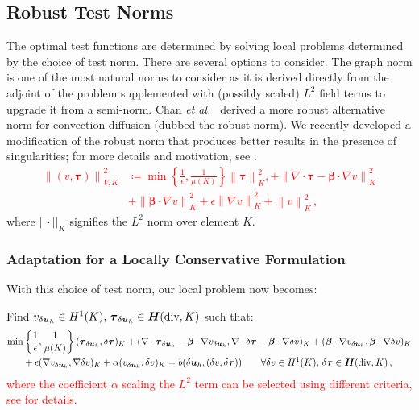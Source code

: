 \documentclass[letterpaper]{article}
\def\btau{\boldsymbol\tau}
\def\bbeta{\boldsymbol\beta}
\newcommand{\bs}[1]{\boldsymbol{#1}}
\newcommand{\norm}[1]{\left\| #1 \right\|}
\newcommand{\LRp}[1]{\left( #1 \right)}
\newcommand{\Grad} {\ensuremath{\nabla}}
\newcommand{\bfH}{\mbox{\boldmath $H$}}
\newcommand{\HdivK}{\bfH(\text{div},K)}
\newcommand{\HOneK}{H^{1}(K)}
\newcommand{\vdeltau}{v_{\delta\bs u_h}}
\newcommand{\taudeltau}{\btau_{\delta\bs u_h}}
\def\etal{{\it et al.~}}
\newcommand{\grad}{\nabla}
\renewcommand{\div}{\grad \cdot}
\newcommand{\red}[1]{\textcolor{red}{#1}}
\begin{document}

\subsection{Robust Test Norms}
\label{sec:robustNorms}
The optimal test functions are determined by solving local problems determined
by the choice of test norm. There are several options to consider.
The graph norm \red{\cite{DPGOverview2}} is one of the most natural norms to consider
as it is derived directly from the adjoint of the problem supplemented with
(possibly scaled) $L^2$ field terms to upgrade it from a semi-norm.
Chan \etal\cite{ChanHeuerThanhDemkowicz2012} derived a more robust alternative
norm for convection diffusion (dubbed the robust norm). We recently
developed a modification of the robust norm that produces better
results in the presence of singularities; 
for more details and motivation, see \cite{JesseDissertation}.
\red{
\begin{align}
\norm{\LRp{v,\btau}}_{V,K}^2 &\coloneqq
\min\left\{\frac{1}{\epsilon},\frac{1}{\mu(K)}\right\}\norm{\btau}_K^2,
+ \norm{\div \btau - \bbeta\cdot\Grad v}_K^2 \nonumber\\
&+\norm{\bbeta\cdot \Grad v}_K^2
+ \epsilon\norm{\Grad v}_K^2
+ \norm{v}^2_K\,,
\end{align}
}
where $||\cdot||_K$ signifies the $L^2$ norm over element $K$.\

\subsubsection{Adaptation for a Locally Conservative Formulation}
With this choice of test norm, our local problem now becomes:

Find $\vdeltau\in\HOneK,\,\taudeltau\in\HdivK$ such that:
\red{
\begin{align}
\min&\left\{\frac{1}{\epsilon},\frac{1}{\mu(K)}\right\}(\taudeltau,\delta\btau)_K
+(\nabla\cdot\taudeltau-\bbeta\cdot\nabla
\vdeltau,\nabla\cdot\delta\btau-\bbeta\cdot\nabla\delta v)_K
+(\bbeta\cdot\nabla\vdeltau,\bbeta\cdot\nabla \delta v)_K\nonumber\\
&+\epsilon(\nabla\vdeltau,\nabla \delta v)_K
+\alpha(\vdeltau,\delta v)_K
=b(\delta\bs u_h,(\delta v,\delta\btau))
\quad\quad\forall\delta v\in\HOneK,\,\delta\btau\in\HdivK\,,
\label{eq:localSolve}
\end{align}
}
\red{
where the coefficient $\alpha$ scaling the $L^2$ term can be selected using
different criteria, see \cite{DemkowiczHeuer,ChanHeuerThanhDemkowicz2012} for details.
}
\end{document}
